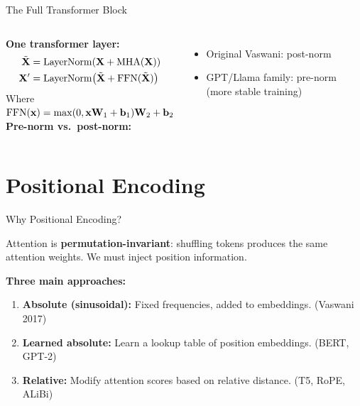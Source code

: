 \documentclass[aspectratio=169,10pt]{beamer}
\begin{document}
\begin{frame}{The Full Transformer Block}
  \begin{columns}[T]
      \textbf{One transformer layer:}
      \begin{align*}
        \tilde{\mathbf{X}} &= \mathrm{LayerNorm}\!\left(\mathbf{X} + \mathrm{MHA}(\mathbf{X})\right)\\
        \mathbf{X}' &= \mathrm{LayerNorm}\!\left(\tilde{\mathbf{X}} + \mathrm{FFN}(\tilde{\mathbf{X}})\right)
      \end{align*}
      \vspace{0.3em}
      Where $\mathrm{FFN}(\mathbf{x}) = \max(0,\mathbf{x}\mathbf{W}_1 + \mathbf{b}_1)\mathbf{W}_2 + \mathbf{b}_2$
      \vspace{0.5em}\\
      \textbf{Pre-norm vs.\ post-norm:}
      \begin{itemize}
        \item Original Vaswani: post-norm
        \item GPT/Llama family: pre-norm (more stable training)
      \end{itemize}
      
  \end{columns}
\end{frame}

\section{Positional Encoding}

\begin{frame}{Why Positional Encoding?}
  \begin{tcolorbox}[alertbox, title=Problem]
    Attention is \textbf{permutation-invariant}: shuffling tokens produces the same attention
    weights. We must inject position information.
  \end{tcolorbox}
  \vspace{0.5em}
  \textbf{Three main approaches:}
  \begin{enumerate}
    \item \textbf{Absolute (sinusoidal):} Fixed frequencies, added to embeddings. (Vaswani 2017)
    \item \textbf{Learned absolute:} Learn a lookup table of position embeddings. (BERT, GPT-2)
    \item \textbf{Relative:} Modify attention scores based on relative distance. (T5, RoPE, ALiBi)
  \end{enumerate}
\end{frame}
\end{document}

